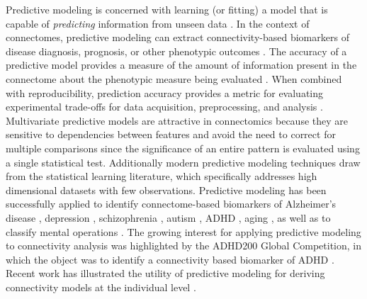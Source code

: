 \documentclass[5p]{elsarticle}
\begin{document}



Predictive modeling is concerned with learning (or fitting) a model that is
capable of \emph{predicting} information from unseen data
\cite{pereira2009}.  In the context of connectomes, predictive modeling
can extract connectivity-based biomarkers of disease diagnosis,
prognosis, or other phenotypic outcomes \cite{craddock2009, dosenbach2010}. The
accuracy of a predictive model provides a measure of the amount of information
present in the connectome about the phenotypic measure being evaluated
\cite{kjems2002, kriegeskorte2006}.  When combined with reproducibility, prediction accuracy
provides a metric for evaluating experimental trade-offs for data acquisition,
preprocessing, and analysis \cite{strother2002, laconte2003}.  Multivariate
predictive models are attractive in connectomics because they are sensitive to dependencies
between features and avoid the need to correct for multiple comparisons since
the significance of an entire pattern is evaluated using a single statistical
test. 
Additionally modern predictive modeling techniques draw from the
statistical learning literature, which specifically addresses
 high dimensional datasets with few observations.
Predictive modeling has been
successfully applied to identify connectome-based biomarkers of Alzheimer's
disease \cite{stonnington2010}, depression \cite{craddock2009, zeng2012}, schizophrenia
\cite{cecchi2009, shen2010}, autism \cite{anderson2011}, ADHD \cite{zhu2008}, aging
\cite{dosenbach2010}, as well as to classify mental operations
\cite{richiardi2011,shirer2012}. The growing interest for applying
predictive modeling to connectivity analysis was highlighted by the ADHD200
Global Competition, in which the object was to identify a connectivity based
biomarker of ADHD \cite{adhd2002012}. Recent work has illustrated the utility
of predictive modeling for deriving connectivity models at the individual level
\cite{chu2011}.
\end{document}
